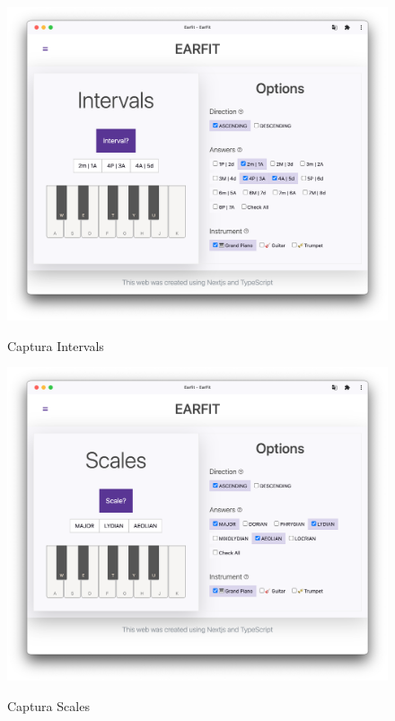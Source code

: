 \documentclass[12pt,twoside,titlepage]{report}
\begin{document}
{\begin{figure}[H]
    \centering
    \includegraphics[scale=0.3]{Capturas Earfit/Tablet/Intervals}
    \label{fig:TabletIntervals}
    \caption{Captura Intervals}
\end{figure}

\begin{figure}[H]
    \centering
    \includegraphics[scale=0.3]{Capturas Earfit/Tablet/Scales}
    \label{fig:TabletScales}
    \caption{Captura Scales}
\end{figure}

}
\end{document}
